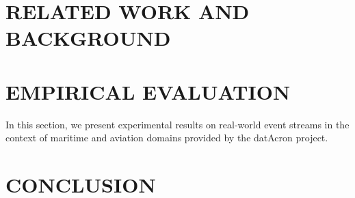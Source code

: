 



\section{RELATED WORK AND BACKGROUND}






 



\section{EMPIRICAL EVALUATION}
In this section, we present experimental results on real-world event streams in the context of maritime and aviation domains provided by the datAcron project.

\section{CONCLUSION}